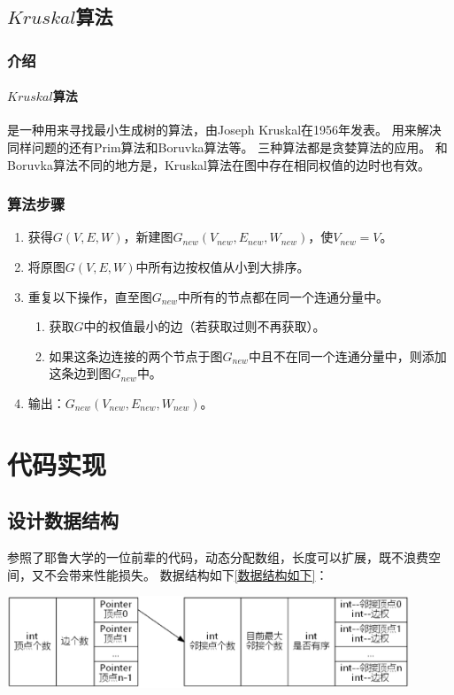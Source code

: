 \documentclass[a4paper,10pt]{ctexart}
\begin{document}
\subsection{$Kruskal$算法}
\subsubsection{介绍}
\paragraph{$Kruskal$算法}是一种用来寻找最小生成树的算法，由Joseph Kruskal在1956年发表。
用来解决同样问题的还有Prim算法和Boruvka算法等。
三种算法都是贪婪算法的应用。
和Boruvka算法不同的地方是，Kruskal算法在图中存在相同权值的边时也有效。
\subsubsection{算法步骤}
\begin{enumerate}
  \item 获得$G(V,E,W)$，新建图$G_{new}(V_{new},E_{new},W_{new})$，使$V_{new} = V$。
  \item 将原图$G(V,E,W)$中所有边按权值从小到大排序。
  \item 重复以下操作，直至图$G_{new}$中所有的节点都在同一个连通分量中。
      \begin{enumerate}
       \item 获取$G$中的权值最小的边（若获取过则不再获取）。
       \item 如果这条边连接的两个节点于图$G_{new}$中且不在同一个连通分量中，则添加这条边到图$G_{new}$中。
      \end{enumerate}
  \item 输出：$G_{new}(V_{new},E_{new},W_{new})$。
\end{enumerate}


\section{代码实现}
\subsection{设计数据结构}
参照了耶鲁大学的一位前辈的代码，动态分配数组，长度可以扩展，既不浪费空间，又不会带来性能损失。
数据结构如下\ref{数据结构如下}：

\includegraphics[width=0.9\textwidth]{../Pics/DataStruct.eps}
\end{document}
